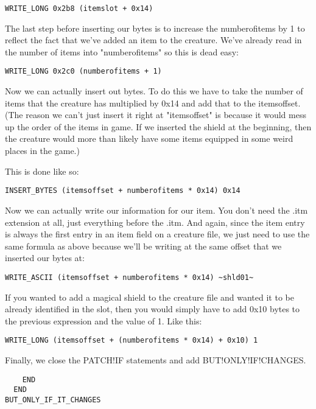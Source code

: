 \documentclass{article}
\def\ttref#1{\ahrefloc{#1}{\tt #1}}
\begin{document}
\begin{verbatim}
WRITE_LONG 0x2b8 (itemslot + 0x14)
\end{verbatim}

The last step before inserting our bytes is to increase the numberofitems by 1 to
reflect the fact that we've added an item to the creature.  We've already
read in the number of items into "numberofitems" so this is dead easy:

\begin{verbatim}
WRITE_LONG 0x2c0 (numberofitems + 1)
\end{verbatim}

Now we can actually insert out bytes.  To do this we have to take the
number of items that the creature has multiplied by 0x14 and add that to
the itemsoffset.  (The reason we can't just insert it right at
"itemsoffset" is because it would mess up the order of the items in game.
If we inserted the shield at the beginning, then the creature would more
than likely have some items equipped in some weird places in the game.)

This is done like so:

\begin{verbatim}
INSERT_BYTES (itemsoffset + numberofitems * 0x14) 0x14
\end{verbatim}

Now we can actually write our information for our item.  You don't need the
.itm extension at all, just everything before the .itm.  And again, since
the item entry is always the first entry in an item field on a creature
file, we just need to use the same formula as above because we'll be
writing at the same offset that we inserted our bytes at:

\begin{verbatim}
WRITE_ASCII (itemsoffset + numberofitems * 0x14) ~shld01~
\end{verbatim}

If you wanted to add a magical shield to the creature file and wanted it to
be already identified in the slot, then you would simply have to add 0x10
bytes to the previous expression and \ttref{WRITE!LONG} the value of 1.
Like this:

\begin{verbatim}
WRITE_LONG (itemsoffset + (numberofitems * 0x14) + 0x10) 1
\end{verbatim}

Finally, we close the PATCH!IF statements and add BUT!ONLY!IF!CHANGES.

\begin{verbatim}
    END
  END
BUT_ONLY_IF_IT_CHANGES
\end{verbatim}
\end{document}

